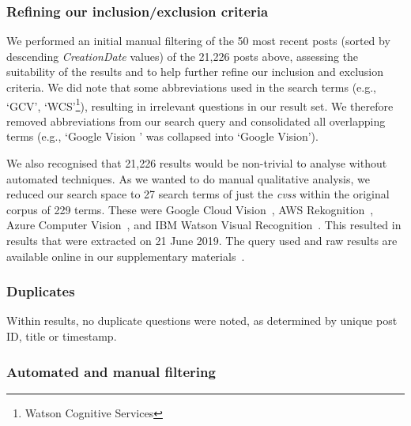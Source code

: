 \subsubsection{Refining our inclusion/exclusion criteria}
\label{icse2020:ssec:method:filtering:refining}

We performed an initial manual filtering of the 50 most recent posts (sorted by descending \textit{CreationDate} values) of the 21,226 posts above, assessing the suitability of the results and to help further refine our inclusion and exclusion criteria. We did note that some abbreviations used in the search terms (e.g., `GCV', `WCS'\footnote{Watson Cognitive Services}), resulting in irrelevant questions in our result set. We therefore removed abbreviations from our search query and consolidated all overlapping terms (e.g., `Google Vision \uline{\textbf{}}' was collapsed into `Google Vision').

We also recognised that 21,226 results would be non-trivial to analyse without automated techniques. As we wanted to do manual qualitative analysis, we reduced our search space to 27 search terms of just the \textit{\glspl{cvs}} within the original corpus of 229 terms. These were Google Cloud Vision~, AWS Rekognition~, Azure Computer Vision~, and IBM Watson Visual Recognition~. This resulted in \NumPostsFromSO{} results that were extracted on 21 June 2019. The query used and raw results are available online in our supplementary materials~.

\subsubsection{Duplicates} Within \NumPostsFromSO{} results, no duplicate questions were noted, as determined by unique post ID, title or timestamp.

\subsubsection{Automated and manual filtering}
\label{icse2020:ssec:method:filtering:automated-manual-filtering}

